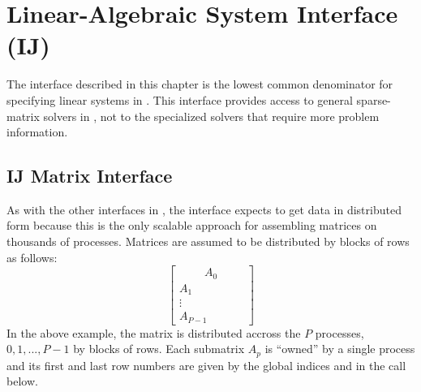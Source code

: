 \chapter{Linear-Algebraic System Interface (IJ)}
\label{Linear-Algebraic System Interface}

The  interface described in this chapter is the lowest common
denominator for specifying linear systems in \hypre{}.  This interface
provides access to general sparse-matrix solvers in \hypre{}, not
to the specialized solvers that require more problem information.


\section{IJ Matrix Interface}

As with the other interfaces in \hypre{}, the  interface
expects to get data in distributed form because this is the only
scalable approach for assembling matrices on thousands of processes.
Matrices are assumed to be distributed by blocks of rows as follows:
\begin{equation}
\left[
\begin{array}{c}
~~~~~~~~~~ A_0 ~~~~~~~~~~ \\
A_1 \\
\vdots \\
A_{P-1}
\end{array}
\right]
\end{equation}
In the above example, the matrix is distributed accross the $P$
processes, $0, 1, ..., P-1$ by blocks of rows.  Each submatrix $A_p$
is ``owned'' by a single process and its first and last row numbers
are given by the global indices  and  in the
 call below.

